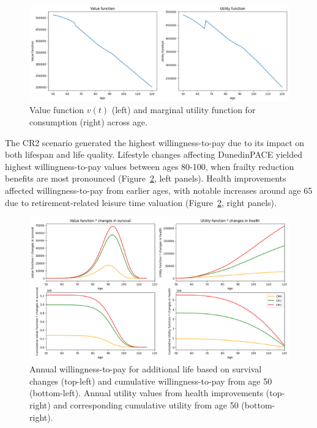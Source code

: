 \begin{figure}[h]
\centering
\small
\includegraphics[width=\textwidth]{figures/Figure7.png}
\caption{Value function $v(t)$ (left) and marginal utility function for consumption (right) across age.}
\label{fig:value_utility}
\end{figure}

The CR2 scenario generated the highest willingness-to-pay due to its impact on both lifespan and life quality. Lifestyle changes affecting DunedinPACE yielded highest willingness-to-pay values between ages 80-100, when frailty reduction benefits are most pronounced (Figure~\ref{fig:wtp}, left panels). Health improvements affected willingness-to-pay from earlier ages, with notable increases around age 65 due to retirement-related leisure time valuation (Figure~\ref{fig:wtp}, right panels).

\begin{figure}[h]
\centering
\small
\includegraphics[width=\textwidth]{figures/Figure8.png}
\caption{Annual willingness-to-pay for additional life based on survival changes (top-left) and cumulative willingness-to-pay from age 50 (bottom-left). Annual utility values from health improvements (top-right) and corresponding cumulative utility from age 50 (bottom-right).}
\label{fig:wtp}
\end{figure}

